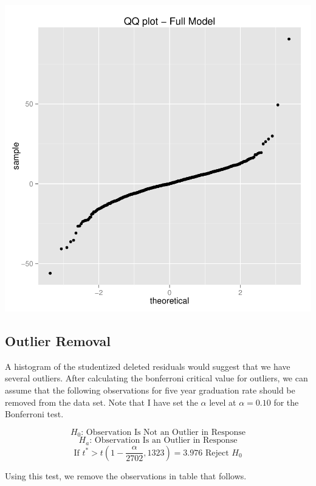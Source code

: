 \documentclass{article}
\begin{document}
\includegraphics{Fig-qqplot}

\FloatBarrier

\subsection{Outlier Removal}

A histogram of the studentized deleted residuals would suggest that we have several outliers. After calculating the bonferroni critical value for outliers, we can assume that the following observations for five year graduation rate should be removed from the data set. Note that I have set the $\alpha$ level at $\alpha = 0.10$ for the Bonferroni test.

$$ H_0 \text{: Observation Is Not an Outlier in Response} $$
$$ H_a \text{: Observation Is an Outlier in Response} $$
$$ \text{If }t^* > t(1-\frac{\alpha}{2702},1323) = 3.976 \text{ Reject }H_0 $$

Using this test, we remove the observations in table that follows.
\end{document}
